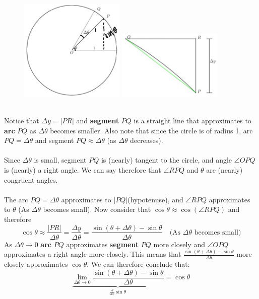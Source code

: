 \documentclass{report}
\begin{document}
\begin{figure}[h]
\includegraphics[width=5cm]{Capture11}
\includegraphics[width=5cm]{Capture12}
\centering\\
\end{figure}\\
Notice that $\Delta y=|PR|$ and \textbf{segment} $PQ$ is a straight line that approximates to 
\textbf{arc} $PQ$ as $\Delta\theta$ becomes smaller. Also note that since the circle is of 
radius 1, arc $PQ=\Delta\theta$ and segment
$PQ\approx\Delta\theta$ (as $\Delta\theta$ decreases).\\
\vspace{2mm}\\
Since $\Delta\theta$ is small, segment $PQ$ is (nearly) tangent to the circle, and angle
$\angle OPQ$ is (nearly) a right angle. We can say therefore that $\angle RPQ$ and $\theta$ are
(nearly) congruent angles.\\
\vspace{2mm}\\
The arc $PQ=\Delta\theta$ approximates to $|PQ|$(hypotenuse), and $\angle RPQ$ 
approximates to $\theta$ (As $\Delta\theta$ becomes small). Now consider that
$\cos\theta\approx\cos(\angle RPQ)$ and therefore
\begin{equation*}
\cos\theta\approx\frac{|PR|}{\Delta\theta}=\frac{\Delta y}{\Delta\theta}
=\frac{\sin(\theta+\Delta\theta)-\sin\theta}{\Delta\theta}\quad
\text{(As $\Delta\theta$ becomes small)}
\end{equation*}
As $\Delta\theta\to0$ \textbf{arc} $PQ$ approximates \textbf{segment} $PQ$ more closely and 
$\angle OPQ$ approximates a right angle more closely. This means that
$\frac{\sin(\theta+\Delta\theta)-\sin\theta}{\Delta\theta}$ more closely approximates 
$\cos\theta$. We can therefore conclude that:
\begin{equation*}
\underbrace{\lim_{\Delta\theta\to0}\frac{\sin(\theta+\Delta\theta)-\sin\theta}
{\Delta\theta}}_{\frac{d}{dx}\sin\theta}=\cos\theta
\end{equation*}
\newpage
\end{document}
